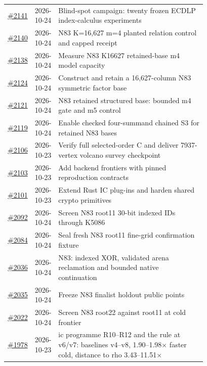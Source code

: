 {\begin{longtable}{@{}r l >{\raggedright\arraybackslash}p{0.78\linewidth}@{}}
\href{https://github.com/aburan28/crypto/pull/2141}{\#2141} & 2026-10-24 & Blind-spot campaign: twenty frozen ECDLP index-calculus experiments\\
\href{https://github.com/aburan28/crypto/pull/2140}{\#2140} & 2026-10-24 & N83 K=16,627 m=4 planted relation control and capped receipt\\
\href{https://github.com/aburan28/crypto/pull/2138}{\#2138} & 2026-10-24 & Measure N83 K16627 retained-base m4 model capacity\\
\href{https://github.com/aburan28/crypto/pull/2124}{\#2124} & 2026-10-24 & Construct and retain a 16,627-column N83 symmetric factor base\\
\href{https://github.com/aburan28/crypto/pull/2121}{\#2121} & 2026-10-24 & N83 retained structured base: bounded m4 gate and m5 control\\
\href{https://github.com/aburan28/crypto/pull/2119}{\#2119} & 2026-10-24 & Enable checked four-summand chained S3 for retained N83 bases\\
\href{https://github.com/aburan28/crypto/pull/2106}{\#2106} & 2026-10-23 & Verify full selected-order C and deliver 7937-vertex volcano survey checkpoint\\
\href{https://github.com/aburan28/crypto/pull/2103}{\#2103} & 2026-10-23 & Add backend frontiers with pinned reproduction contracts\\
\href{https://github.com/aburan28/crypto/pull/2101}{\#2101} & 2026-10-23 & Extend Rust IC plug-ins and harden shared crypto primitives\\
\href{https://github.com/aburan28/crypto/pull/2092}{\#2092} & 2026-10-24 & Screen N83 root11 30-bit indexed IDs through K5086\\
\href{https://github.com/aburan28/crypto/pull/2084}{\#2084} & 2026-10-24 & Seal fresh N83 root11 fine-grid confirmation fixture\\
\href{https://github.com/aburan28/crypto/pull/2036}{\#2036} & 2026-10-24 & N83: indexed XOR, validated arena reclamation and bounded native continuation\\
\href{https://github.com/aburan28/crypto/pull/2035}{\#2035} & 2026-10-24 & Freeze N83 finalist holdout public points\\
\href{https://github.com/aburan28/crypto/pull/2022}{\#2022} & 2026-10-24 & Screen N83 root22 against root11 at cold frontier\\
\href{https://github.com/aburan28/crypto/pull/1978}{\#1978} & 2026-10-23 & ic programme R10--R12 and the rule at v6/\allowbreak{}v7: baselines v4--v8, 1.90--1.98$\times$ faster cold, distance to rho 3.43--11.51$\times$\\

\end{longtable}}
